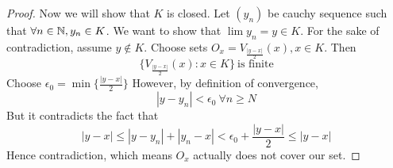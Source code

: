 \begin{enumerate}
\begin{proof}
        Now we will show that $K$ is closed. Let $(y_n)$ be cauchy sequence such that $\forall n \in {\mathbb{N}}, y_n \in K$. We want to show that $\lim y_n = y \in K$. For the sake of contradiction, assume $y \not\in K$. Choose sets $O_x = V_{\frac{|y-x|}{2}}(x), x \in K$. Then
        \[ \{V_{\frac{|y-x|}{2}}(x) : x \in K\} \ \text{is finite}\]
        Choose $\epsilon_0 = \min \{ \frac{|y-x|}{2}\}$
        However, by definition of convergence,
        \[ |y - y_n| < \epsilon_0 \ \forall n \ge N\]
        But it contradicts the fact that
        \[ |y- x| \le |y- y_n| + |y_n-x| < \epsilon_0 + \frac{|y-x|}{2}\le |y-x|\]
        Hence contradiction, which means $O_x$ actually does not cover our set.


    \end{proof}
\end{enumerate}

